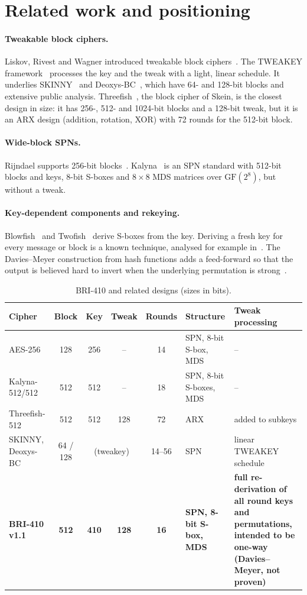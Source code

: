 \documentclass[11pt,a4paper]{article}
\newcommand{\GF}{\mathrm{GF}}
\begin{document}
\section{Related work and positioning}

\paragraph{Tweakable block ciphers.} Liskov, Rivest and Wagner introduced tweakable block
ciphers~\cite{LRW02}. The TWEAKEY framework~\cite{JNP14} processes the key and the tweak with a light, linear
schedule. It underlies SKINNY~\cite{BJK+16} and Deoxys-BC~\cite{JNPS21}, which have 64- and 128-bit blocks and
extensive public analysis. Threefish~\cite{FLS+10}, the block cipher of Skein, is the closest design in size: it
has 256-, 512- and 1024-bit blocks and a 128-bit tweak, but it is an ARX design (addition, rotation, XOR) with
72 rounds for the 512-bit block.

\paragraph{Wide-block SPNs.} Rijndael supports 256-bit blocks~\cite{DR02}. Kalyna~\cite{OGK+15} is an SPN
standard with 512-bit blocks and keys, 8-bit S-boxes and $8\times 8$ MDS matrices over $\GF(2^8)$, but without
a tweak.

\paragraph{Key-dependent components and rekeying.} Blowfish~\cite{Sch93} and Twofish~\cite{SKW+98} derive
S-boxes from the key. Deriving a fresh key for every message or block is a known technique, analysed for example
in~\cite{AB00}. The Davies--Meyer construction from hash functions adds a feed-forward so that the output is
believed hard to invert when the underlying permutation is strong~\cite{PGV93}.

\begin{table}[ht]
\centering\small
\begin{tabularx}{\textwidth}{@{}lccccl>{\raggedright\arraybackslash}X@{}}
\toprule
Cipher & Block & Key & Tweak & Rounds & Structure & Tweak processing\\
\midrule
AES-256 & 128 & 256 & -- & 14 & SPN, 8-bit S-box, MDS & --\\
Kalyna-512/512 & 512 & 512 & -- & 18 & SPN, 8-bit S-boxes, MDS & --\\
Threefish-512 & 512 & 512 & 128 & 72 & ARX & added to subkeys\\
SKINNY, Deoxys-BC & 64 / 128 & \multicolumn{2}{c}{(tweakey)} & 14--56 & SPN & linear TWEAKEY schedule\\
\textbf{BRI-410 v1.1} & \textbf{512} & \textbf{410} & \textbf{128} & \textbf{16} & \textbf{SPN, 8-bit S-box, MDS} &
\textbf{full re-derivation of all round keys and permutations, intended to be one-way (Davies--Meyer, not proven)}\\
\bottomrule
\end{tabularx}
\caption{BRI-410 and related designs (sizes in bits).}
\end{table}
\end{document}
